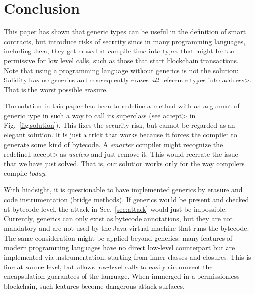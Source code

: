 \section{Conclusion}\label{sec:conclusion} 

This paper has shown that generic types can be useful in the definition
of smart contracts, but introduce risks of security since in many
programming languages, including Java, they get erased at compile time
into types that might be too permissive for low level calls, such as
those that start blockchain transactions. Note that using a programming
language without generics is not the solution: Solidity has no generics
and consequently erases \emph{all} reference types into \<address>.
That is the worst possible erasure.

The solution in this paper has been to redefine a method with an argument
of generic type in such a way to call its superclass
(see \<accept> in Fig.~\ref{fig:solution}). This fixes the security risk,
but cannot be regarded as an elegant solution. It is just a trick that
works because it forces the compiler to generate some kind of bytecode.
A \emph{smarter} compiler might recognize the redefined \<accept> as
\emph{useless} and just remove it. This would recreate the issue that
we have just solved. That is, our solution works only for the way
compilers compile \emph{today}.

With hindsight, it is questionable to have implemented generics by erasure
and code instrumentation (bridge methods). If generics would be present
and checked at bytecode level, the attack in Sec.~\ref{sec:attack} would just
be impossible. Currently, generics can only exist as bytecode annotations,
but they are not mandatory and are not used by the Java virtual machine
that runs the bytecode. The same consideration might be applied beyond
generics: many features of modern programming
languages have no direct low-level
counterpart but are implemented via instrumentation, starting from
inner classes and closures. This is fine at source level, but allows
low-level calls to easily circumvent
the encapsulation guarantees of the language. When immerged in a permissionless
blockchain, such features become dangerous attack surfaces.
